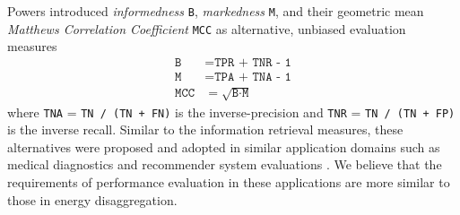 \documentclass[twocolumn,letter,10pt]{IEEEtran} %
\begin{document}
Powers \cite{Powers_2011_EvaluationMetrics} introduced \emph{informedness} \texttt{B}, \emph{markedness} \texttt{M}, and their geometric mean \emph{Matthews Correlation Coefficient} \texttt{MCC} as alternative, unbiased evaluation measures
\begin{align}
\texttt{B} &= \texttt{TPR + TNR - 1} \\
\texttt{M} &= \texttt{TPA + TNA - 1} \\
\texttt{MCC} &= \sqrt{\texttt{B} \cdot \texttt{M}}
\end{align}
where \texttt{TNA} = \texttt{TN / (TN + FN)} is the inverse-precision and \texttt{TNR} = \texttt{TN / (TN + FP)} is the inverse recall. Similar to the information retrieval measures, these alternatives were proposed and adopted in similar application domains such as medical diagnostics \cite{Youden_1950,Metz_1978_ROCAnalysis} and recommender system evaluations \cite{Schroder_2011_SettingGoals}. We believe that the requirements of performance evaluation in these applications are more similar to those in energy disaggregation.
\end{document}
